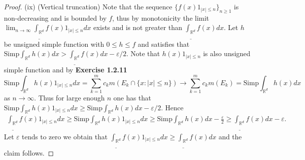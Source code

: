 \documentclass[a4paper]{article}
\begin{document}
\begin{proof}
(ix) (Vertical truncation) Note that the sequence $\{f(x)1_{|x| \leq n}\}_{n \geq 1}$ is non-decreasing and is bounded
by $f$, thus by monotonicity the limit $\lim_{n \to \infty} \underline{\int_{\mathbb{R}^d}} f(x)1_{|x| \leq n} dx$ exists
and is not greater than $\underline{\int_{\mathbb{R}^d}}f(x) dx$. Let $h$ be unsigned simple function with $0 \leq h \leq f$
and satisfies that $\mathrm{Simp}\int_{\mathbb{R}^d} h(x) dx > \underline{\int_{\mathbb{R}^d}}f(x) dx - \varepsilon / 2$.
Note that $h(x)1_{|x| \leq n}$ is also unsigned simple function and by {\bfseries Exercise 1.2.11} $$
\mathrm{Simp}\int_{\mathbb{R}^d} h(x)1_{|x| \leq n} dx = \sum_{k = 1}^m c_km(E_k \cap \{x : |x| \leq n\}) \to
\sum_{k = 1}^m c_km(E_k) = \mathrm{Simp}\int_{\mathbb{R}^d} h(x) dx
$$as $n \to \infty$. Thus for large enough $n$ one has that $\mathrm{Simp}\int_{\mathbb{R}^d} h(x)1_{|x| \leq n} dx
\geq \mathrm{Simp}\int_{\mathbb{R}^d} h(x) dx - \varepsilon / 2$. Hence \begin{align*}
\underline{\int_{\mathbb{R}^d}}f(x)1_{|x| \leq n} dx \geq \mathrm{Simp}\int_{\mathbb{R}^d} h(x)1_{|x| \leq n} dx 
\geq \mathrm{Simp}\int_{\mathbb{R}^d} h(x) dx - \frac{\varepsilon}{2} \geq \underline{\int_{\mathbb{R}^d}}f(x) dx - \varepsilon.
\end{align*}
Let $\varepsilon$ tends to zero we obtain that $\underline{\int_{\mathbb{R}^d}}f(x)1_{|x| \leq n} dx \geq 
\underline{\int_{\mathbb{R}^d}}f(x) dx$ and the claim follows.


\end{proof}
\end{document}
